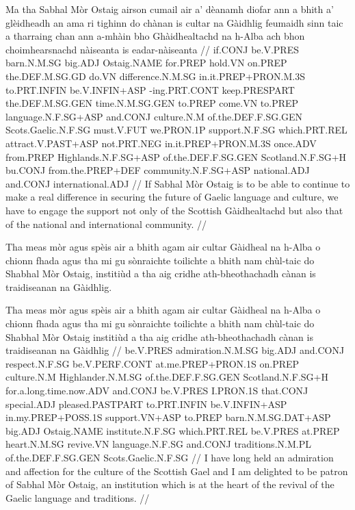 \documentclass[a4paper,10pt]{article}
\begin{document}
\vspace{4mm}
\gla Ma tha Sabhal Mòr Ostaig airson cumail air a' dèanamh diofar ann a bhith a' glèidheadh an ama ri tighinn do chànan is cultar na Gàidhlig feumaidh sinn taic a tharraing chan ann a-mhàin bho Ghàidhealtachd na h-Alba ach bhon choimhearsnachd nàiseanta is eadar-nàiseanta  //
\glb if.CONJ be.V.PRES barn.N.M.SG big.ADJ Ostaig.NAME for.PREP hold.VN on.PREP the.DEF.M.SG.GD do.VN difference.N.M.SG in.it.PREP+PRON.M.3S to.PRT.INFIN be.V.INFIN+ASP -ing.PRT.CONT keep.PRESPART the.DEF.M.SG.GEN time.N.M.SG.GEN to.PREP come.VN to.PREP language.N.F.SG+ASP and.CONJ culture.N.M of.the.DEF.F.SG.GEN Scots.Gaelic.N.F.SG must.V.FUT we.PRON.1P support.N.F.SG which.PRT.REL attract.V.PAST+ASP not.PRT.NEG in.it.PREP+PRON.M.3S once.ADV from.PREP Highlands.N.F.SG+ASP of.the.DEF.F.SG.GEN Scotland.N.F.SG+H bu.CONJ from.the.PREP+DEF community.N.F.SG+ASP national.ADJ and.CONJ international.ADJ  //
\glft If Sabhal Mòr Ostaig is to be able to continue to make a real difference in securing the future of Gaelic language and culture, we have to engage the support not only of the Scottish Gàidhealtachd but also that of the national and international community. //
\endgl
\xe

\ex
\begingl
\glpre Tha meas mòr agus spèis air a bhith agam air cultar Gàidheal na h-Alba o chionn fhada agus tha mi gu sònraichte toilichte a bhith nam chùl-taic do Shabhal Mòr Ostaig, institiùd a tha aig cridhe ath-bheothachadh cànan is traidiseanan na Gàidhlig. 

\vspace{4mm}
\gla Tha meas mòr agus spèis {air a bhith} agam air cultar Gàidheal na h-Alba {o chionn fhada} agus tha mi gu sònraichte toilichte a bhith nam chùl-taic do Shabhal Mòr Ostaig institiùd a tha aig cridhe ath-bheothachadh cànan is traidiseanan na Gàidhlig  //
\glb be.V.PRES admiration.N.M.SG big.ADJ and.CONJ respect.N.F.SG be.V.PERF.CONT at.me.PREP+PRON.1S on.PREP culture.N.M Highlander.N.M.SG of.the.DEF.F.SG.GEN Scotland.N.F.SG+H for.a.long.time.now.ADV and.CONJ be.V.PRES I.PRON.1S that.CONJ special.ADJ pleased.PASTPART to.PRT.INFIN be.V.INFIN+ASP in.my.PREP+POSS.1S support.VN+ASP to.PREP barn.N.M.SG.DAT+ASP big.ADJ Ostaig.NAME institute.N.F.SG which.PRT.REL be.V.PRES at.PREP heart.N.M.SG revive.VN language.N.F.SG and.CONJ traditions.N.M.PL of.the.DEF.F.SG.GEN Scots.Gaelic.N.F.SG  //
\glft I have long held an admiration and affection for the culture of the Scottish Gael and I am delighted to be patron of Sabhal Mòr Ostaig, an institution which is at the heart of the revival of the Gaelic language and traditions. //
\endgl
\xe
\end{document}
